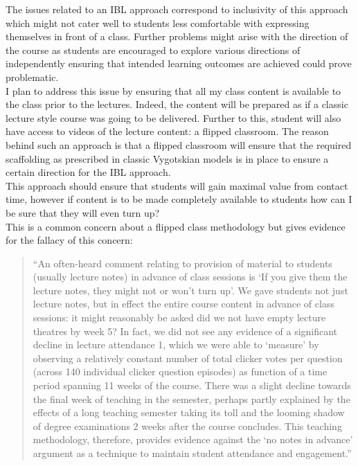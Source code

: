\documentclass[a4paper,12pt]{article}
\begin{document}
The issues related to an IBL approach correspond to inclusivity of this approach which might not cater well to students less comfortable with expressing themselves in front of a class. Further problems might arise with the direction of the course as students are encouraged to explore various directions of independently ensuring that intended learning outcomes are achieved could prove problematic.\\

I plan to address this issue by ensuring that all my class content is available to the class prior to the lectures. Indeed, the content will be prepared as if a classic lecture style course was going to be delivered. Further to this, student will also have access to videos of the lecture content: a flipped classroom. The reason behind such an approach is that a flipped classroom will ensure that the required scaffolding as prescribed in classic Vygotskian models \cite{Vygotsky1978a} is in place to ensure a certain direction for the IBL approach.\\

This approach should ensure that students will gain maximal value from contact time, however if content is to be made completely available to students how can I be sure that they will even turn up?\\

This is a common concern about a flipped class methodology but \cite{Bates} gives evidence for the fallacy of this concern:

\begin{quote}
    ``An often-heard comment relating to provision of material to students (usually lecture notes) in advance of class sessions is `If you give them the lecture notes, they might not or won't turn up'. We gave students not just lecture notes, but in effect the entire course content in advance of class sessions: it might reasonably be asked did we not have empty lecture theatres by week 5? In fact, we did not see any evidence of a significant decline in lecture attendance 1, which we were able to `measure' by observing a relatively constant number of total clicker votes per question (across 140 individual clicker question episodes) as function of a time period spanning 11 weeks of the course. There was a slight decline towards the final week of teaching in the semester, perhaps partly explained by the effects of a long teaching semester taking its toll and the looming shadow of degree examinations 2 weeks after the course concludes. This teaching methodology, therefore, provides evidence against the `no notes in advance' argument as a technique to maintain student attendance and engagement.''
\end{quote}
\end{document}
